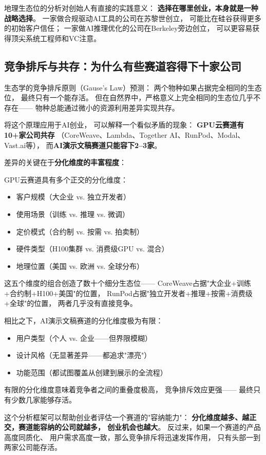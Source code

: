 地理生态位的分析对创始人有直接的实践意义：
\textbf{选择在哪里创业，本身就是一种战略选择}。
一家做合规驱动AI工具的公司在苏黎世创立，
可能比在硅谷获得更多的初始客户信任；
一家做AI推理优化的公司在Berkeley旁边创立，
可以更容易获得顶尖系统工程师和VC注意。

\subsection{竞争排斥与共存：为什么有些赛道容得下十家公司}

生态学的竞争排斥原则（Gause's Law）预测：
两个物种如果占据完全相同的生态位，
最终只有一个能存活。
但在自然界中，严格意义上完全相同的生态位几乎不存在——
物种总能通过微小的资源利用差异实现共存。

将这个原理应用于AI创业，
可以解释一个看似矛盾的现象：
\textbf{GPU云赛道有10+家公司共存}
（CoreWeave、Lambda、Together AI、RunPod、Modal、Vast.ai等），
而\textbf{AI演示文稿赛道只能容下2--3家}。

差异的关键在于\textbf{分化维度的丰富程度}：

GPU云赛道具有多个正交的分化维度：
\begin{itemize}
  \item 客户规模（大企业 vs. 独立开发者）
  \item 使用场景（训练 vs. 推理 vs. 微调）
  \item 定价模式（合约制 vs. 按需 vs. 拍卖制）
  \item 硬件类型（H100集群 vs. 消费级GPU vs. 混合）
  \item 地理位置（美国 vs. 欧洲 vs. 全球分布）
\end{itemize}

这五个维度的组合创造了数十个细分生态位——
CoreWeave占据"大企业+训练+合约制+H100+美国"的位置，
RunPod占据"独立开发者+推理+按需+消费级+全球"的位置，
两者几乎没有直接竞争。

相比之下，AI演示文稿赛道的分化维度极为有限：
\begin{itemize}
  \item 用户类型（个人 vs. 企业——但界限模糊）
  \item 设计风格（无显著差异——都追求"漂亮"）
  \item 功能范围（都试图覆盖从创建到展示的全流程）
\end{itemize}

有限的分化维度意味着竞争者之间的重叠度极高，
竞争排斥效应更强——
最终只有少数几家能够存活。

这个分析框架可以帮助创业者评估一个赛道的"容纳能力"：
\textbf{分化维度越多、越正交，赛道能容纳的公司就越多，
创业机会也越大}。
反过来，如果一个赛道的产品高度同质化、
用户需求高度一致，那么竞争排斥将迅速发挥作用，
只有头部一到两家公司能存活。


